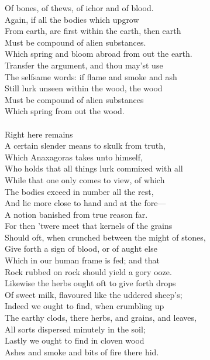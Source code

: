 Of bones, of thews, of ichor and of blood.\\
Again, if all the bodies which upgrow\\
From earth, are first within the earth, then earth\\
Must be compound of alien substances.\\
Which spring and bloom abroad from out the earth.\\
Transfer the argument, and thou may'st use\\
The selfsame words: if flame and smoke and ash\\
Still lurk unseen within the wood, the wood\\
Must be compound of alien substances\\
Which spring from out the wood.\\
\\
Right here remains\\
A certain slender means to skulk from truth,\\
Which Anaxagoras takes unto himself,\\
Who holds that all things lurk commixed with all\\
While that one only comes to view, of which\\
The bodies exceed in number all the rest,\\
And lie more close to hand and at the fore—\\
A notion banished from true reason far.\\
For then 'twere meet that kernels of the grains\\
Should oft, when crunched between the might of stones,\\
Give forth a sign of blood, or of aught else\\
Which in our human frame is fed; and that\\
Rock rubbed on rock should yield a gory ooze.\\
Likewise the herbs ought oft to give forth drops\\
Of sweet milk, flavoured like the uddered sheep's;\\
Indeed we ought to find, when crumbling up\\
The earthy clods, there herbs, and grains, and leaves,\\
All sorts dispersed minutely in the soil;\\
Lastly we ought to find in cloven wood\\
Ashes and smoke and bits of fire there hid.\\
